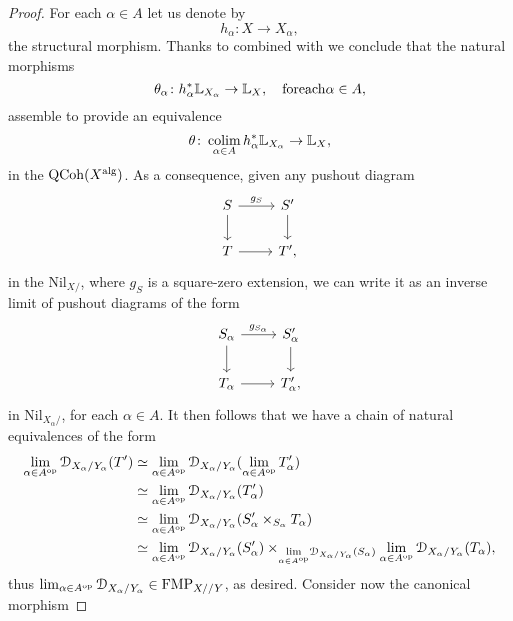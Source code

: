 \documentclass[10pt,a4paper,reqno]{amsart} %
\theoremstyle{plain}
\theoremstyle{definition}
\theoremstyle{remark}
\numberwithin{equation}{section}
\begin{document}
\begin{proof}  For each $\alpha \in A$ let us denote by
        \[
            h_\alpha \colon X \to X_\alpha,
        \]  
    the structural morphism. Thanks to \cite[Corollary 4.4.1.3]{Lurie_SAG} combined with \cite[Corollary  4.5.1.3]{Lurie_SAG} we conclude that the natural morphisms
        \[
            \theta_\alpha \colon h_\alpha^* \mathbb L_{X_\alpha} \to \mathbb L_{X} , \quad \mathrm{for each } \alpha \in A,
        \]
    assemble to provide an equivalence
        \[
            \theta \colon \operatorname*{colim}_{\alpha \in A} h_\alpha^* \mathbb L_{X_\alpha} \to \mathbb L_X,   
        \]
    in the \infcat $\mathrm{QCoh}(X^\mathrm{alg})$. As a consequence, given any pushout diagram
        \[
        \begin{tikzcd}
            S \ar{r}{g_S} \ar{d} & S' \ar{d} \\
            T \ar{r} & T',
        \end{tikzcd}
        \]
    in the \infcat $\mathrm{Nil}_{X/ }$, where $g_S$ is a square-zero extension, we can write it as an inverse limit of pushout diagrams of the form
        \[
        \begin{tikzcd}
            S_\alpha \ar{r}{g_{S_\alpha}} \ar{d} & S'_\alpha \ar{d} \\
            T_\alpha \ar{r} & T'_\alpha,  
        \end{tikzcd}
        \]
    in $\mathrm{Nil}_{X_\alpha/ }$, for each $\alpha \in A$. It then follows that we have a chain of natural equivalences of the form
        \begin{align*}
            \lim_{\alpha \in A^\mathrm{op}}\mathcal D_{X_\alpha/ Y_\alpha} (T') & \simeq \lim_{\alpha \in A^\mathrm{op}}\mathcal D_{X_\alpha/ Y_\alpha}(\lim_{\alpha \in A^\mathrm{op}} T_\alpha ') \\
                                                                & \simeq \lim_{\alpha \in A^\mathrm{op}} \mathcal D_{X_\alpha/ Y_\alpha}(T'_\alpha) \\
                                                                & \simeq \lim_{\alpha \in A^\mathrm{op}}\mathcal D_{X_\alpha/ Y_\alpha}(S'_\alpha \times_{S_\alpha} T_\alpha) \\
                                                                & \simeq \lim_{\alpha \in A^\mathrm{op}} \mathcal D_{X_\alpha/ Y_\alpha}(S'_\alpha) \times_{\underset{\alpha \in A^\mathrm{op}}{\lim} \mathcal D_{X_\alpha/ Y_\alpha}(S_\alpha)}  \lim_{\alpha \in A^\mathrm{op}} \mathcal D_{X_\alpha/ Y_\alpha}(T_\alpha),
        \end{align*}
    thus $\lim_{\alpha \in A^\mathrm{op}} \mathcal D_{X_\alpha/ Y_\alpha} \in \mathrm{FMP}_{X/ /Y}$, as desired. Consider now the canonical morphism

\end{proof}
\end{document}
